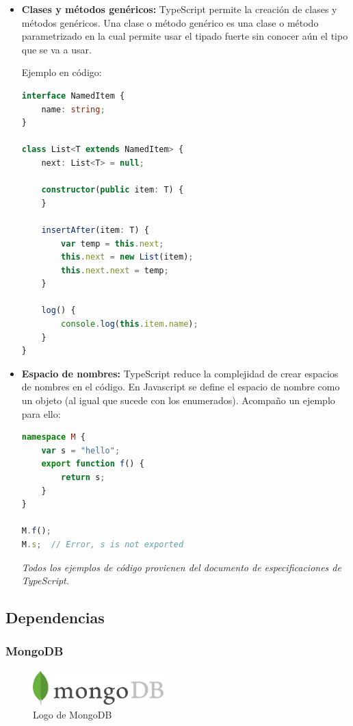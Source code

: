 \documentclass[spanish,12pt, a4paper, twoside]{paper}
\begin{document}
\begin{itemize}
\item\textbf{Clases y métodos genéricos:} TypeScript permite la creación de clases y métodos genéricos. Una clase o método genérico es una clase o método parametrizado en la cual permite usar el tipado fuerte sin conocer aún el tipo que se va a usar.

Ejemplo en código:
\begin{lstlisting}[language=TypeScript]
interface NamedItem {  
    name: string;  
}

class List<T extends NamedItem> {  
    next: List<T> = null;

    constructor(public item: T) {  
    }

    insertAfter(item: T) {  
        var temp = this.next;  
        this.next = new List(item);  
        this.next.next = temp;  
    }

    log() {  
        console.log(this.item.name);  
    }
}
\end{lstlisting}

\item\textbf{Espacio de nombres:} TypeScript reduce la complejidad de crear espacios de nombres en el código. En Javascript se define el espacio de nombre como un objeto (al igual que sucede con los enumerados). Acompaño un ejemplo para ello:

\begin{lstlisting}[language=TypeScript]
namespace M {  
    var s = "hello";  
    export function f() {  
        return s;  
    }  
}

M.f();  
M.s;  // Error, s is not exported
\end{lstlisting}

\emph{Todos los ejemplos de código provienen del documento de especificaciones de TypeScript.}

\end{itemize}

\subsection{Dependencias}

\subsubsection{MongoDB}

\begin{figure}
\centering
	\includegraphics[width=0.45\textwidth]{recursos/mongologo}
\caption{Logo de MongoDB}
\label{fig:Logo de MongoDB}
\end{figure}
\end{document}
